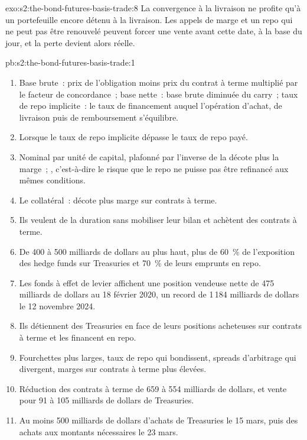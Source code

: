 \begin{solution}{exo:s2:the-bond-futures-basis-trade:8}
La convergence à la livraison ne profite qu'à un portefeuille encore détenu à la livraison. Les appels de marge et un repo qui ne peut pas être renouvelé peuvent forcer une vente avant
cette date, à la base du jour, et la perte devient alors réelle.
\end{solution}

\begin{solution}{pb:s2:the-bond-futures-basis-trade:1}
\begin{enumerate}
\item Base brute~: prix de l'obligation moins prix du contrat à terme multiplié par le facteur de concordance~; base nette~: base brute diminuée du carry~; taux de repo implicite~: le taux de financement auquel
l'opération d'achat, de livraison puis de remboursement s'équilibre.
\item Lorsque le taux de repo implicite dépasse le taux de repo payé.
\item Nominal par unité de capital, plafonné par l'inverse de la décote plus la marge~; , c'est-à-dire le risque que le repo ne puisse pas être refinancé aux mêmes conditions.
\item Le collatéral~: décote plus marge sur contrats à terme.
\item Ils veulent de la duration sans mobiliser leur bilan et achètent des contrats à terme.
\item De 400 à 500 milliards de dollars au plus haut, plus de 60~\% de l'exposition des hedge funds sur Treasuries et 70~\% de leurs emprunts en repo.
\item Les fonds à effet de levier affichent une position vendeuse nette de 475 milliards de dollars au 18 février 2020, un record de 1\,184 milliards de dollars le 12 novembre 2024.
\item Ils détiennent des Treasuries en face de leurs positions acheteuses sur contrats à terme et les financent en repo.
\item Fourchettes plus larges, taux de repo qui bondissent, spreads d'arbitrage qui divergent, marges sur contrats à terme plus élevées.
\item Réduction des contrats à terme de 659 à 554 milliards de dollars, et vente pour 91 à 105 milliards de dollars de Treasuries.
\item Au moins 500 milliards de dollars d'achats de Treasuries le 15 mars, puis des achats aux montants nécessaires le 23 mars.

\end{enumerate}
\end{solution}
